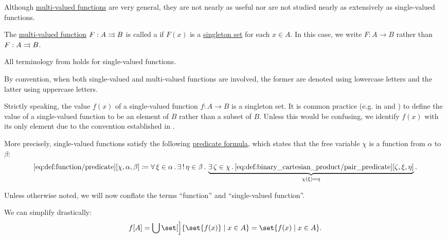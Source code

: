 \begin{definition}\label{def:function}
  Although \hyperref[def:multi_valued_function]{multi-valued functions} are very general, they are not nearly as useful nor are not studied nearly as extensively as single-valued functions.

  The \hyperref[def:multi_valued_function]{multi-valued function} \( F: A \rightrightarrows B \) is called a  if \( F(x) \) is a \hyperref[rem:singleton_sets]{singleton set} for each \( x \in A \). In this case, we write \( F: A \to B \) rather than \( F: A \rightrightarrows B \).

  All terminology from  holds for single-valued functions.

  By convention, when both single-valued and multi-valued functions are involved, the former are denoted using lowercase letters and the latter using uppercase letters.

  Strictly speaking, the value \( f(x) \) of a single-valued function \( f: A \to B \) is a singleton set. It is common practice (e.g. in \cite[def. 3.1]{OpenLogicFull} and \cite[10]{Kelley1955}) to define the value of a single-valued function to be an element of \( B \) rather than a subset of \( B \). Unless this would be confusing, we identify \( f(x) \) with its only element due to the convention established in .

  More precisely, single-valued functions satisfy the following \hyperref[rem:predicate_formula]{predicate formula}, which states that the free variable \( \chi \) is a function from \( \alpha \) to \( \beta \):
  \begin{equation*}\taglabel[\op{IsFun}]{eq:def:function/predicate}
    \ref{eq:def:function/predicate}[\chi, \alpha, \beta] \coloneqq \qforall {\xi \in \alpha} \qExists {\eta \in \beta} \underbrace{ \qexists {\zeta \in \chi} \ref{eq:def:binary_cartesian_product/pair_predicate}[\zeta, \xi, \eta] }_{\chi(\xi) = \eta}.
  \end{equation*}

  Unless otherwise noted, we will now conflate the terms \enquote{function} and \enquote{single-valued function}.

  \begin{thmenum}
     We can simplify  drastically:
    \begin{equation*}
      f[A]
      =
      \bigcup \set[\Big]{ \set{ f(x) } \given x \in A }
      =
      \set{ f(x) \given x \in A }.
    \end{equation*}


\end{thmenum}
\end{definition}
